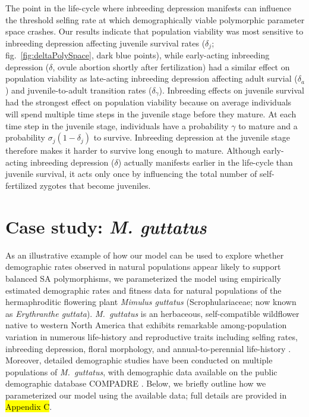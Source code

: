 \documentclass[11pt,draft]{article}
\begin{document}
The point in the life-cycle where inbreeding depression manifests can influence the threshold selfing rate at which demographically viable polymorphic parameter space crashes. Our results indicate that population viability was most sensitive to inbreeding depression affecting juvenile survival rates ($\delta_j$; fig.~\ref{fig:deltaPolySpace}, dark blue points), while early-acting inbreeding depression ($\delta$, ovule abortion shortly after fertilization) had a similar effect on population viability as late-acting inbreeding depression affecting adult survial ($\delta_a$) and juvenile-to-adult transition rates ($\delta_{\gamma}$). Inbreeding effects on juvenile survival had the strongest effect on population viability because on average individuals will spend multiple time steps in the juvenile stage before they mature. At each time step in the juvenile stage, individuals have a probability $\gamma$ to mature and a probability $\sigma_j(1-\delta_j)$ to survive. Inbreeding depression at the juvenile stage therefore makes it harder to survive long enough to mature. Although early-acting inbreeding depression ($\delta$) actually manifests earlier in the life-cycle than juvenile survival, it acts only once by influencing the total number of self-fertilized zygotes that become juveniles.


\section*{Case study: {\itshape M. guttatus}}


As an illustrative example of how our model can be used to explore whether demographic rates observed in natural populations appear likely to support balanced SA polymorphisms, we parameterized the model using empirically estimated demographic rates and fitness data for natural populations of the hermaphroditic flowering plant {\itshape Mimulus guttatus} (Scrophulariaceae; now known as {\itshape Erythranthe guttata}). {\itshape M.~guttatus} is an herbaceous, self-compatible wildflower native to western North America that exhibits remarkable among-population variation in numerous life-history and reproductive traits including selfing rates, inbreeding depression, floral morphology, and annual-to-perennial life-history \citep[e.g.,][]{RitlandGanders1987, Ritland1990, Willis1993, Willis1999a, Willis1999b, WuWillis2008}. Moreover, detailed demographic studies have been conducted on multiple populations of {\itshape M.~guttatus}, with demographic data available on the public demographic database COMPADRE \citep{CompadreDB2020}. Below, we briefly outline how we parameterized our model using the available data; full details are provided in \hl{Appendix C}.
\end{document}
